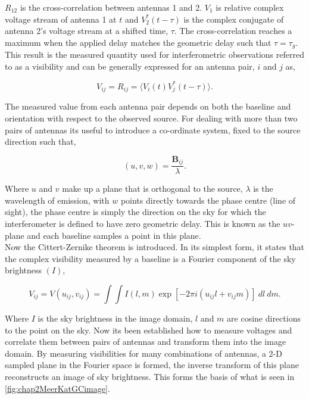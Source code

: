 $R_{12}$ is the cross-correlation between antennas 1 and 2. $V_1$ is relative complex voltage stream of antenna 1 at $t$ and $V^*_2 (t - \tau)$ is the complex conjugate of antenna 2's voltage stream at a shifted time, $\tau$. The cross-correlation reaches a maximum when the applied delay matches the geometric delay such that $\tau = \tau_g$. This result is the measured quantity used for interferometric observations referred to as a visibility and can be generally expressed for an antenna pair, $i$ and $j$ as, 

\begin{equation}
    \boxed{V_{ij} = R_{ij} = \langle  V_i (t) V^*_j (t - \tau) \rangle}.
\end{equation}

The measured value from each antenna pair depends on both the baseline and orientation with respect to the observed source. For dealing with more than two pairs of antennas its useful to introduce a co-ordinate system, fixed to the source direction such that, 

\begin{equation}
    (u, v, w) = \frac{\textbf{B}_{ij}}{\lambda}. 
\end{equation}

Where $u$ and $v$ make up a plane that is orthogonal to the source, $\lambda$ is the wavelength of emission, with $w$ points directly towards the phase centre (line of sight), the phase centre is simply the direction on the sky for which the interferometer is defined to have zero geometric delay. This is known as the $uv$-plane and each baseline samples a point in this plane. \\ 

Now the Cittert-Zernike theorem is introduced. In its simplest form, it states that the complex visibility measured by a baseline is a Fourier component of the sky brightness $(I)$, 

\begin{equation}
    V_{ij} = V (u_{ij}, v_{ij}) = \int \int I (l,m) \exp\left[ -2 \pi i (u_{ij}l + v_{ij}m) \right] ~ dl~dm.
    \label{eq:chap2CittertZernike}
\end{equation}

Where $I$ is the sky brightness in the image domain, $l$ and $m$ are cosine directions to the point on the sky. Now its been established how to measure voltages and correlate them between pairs of antennas and transform them into the image domain. By measuring visibilities for many combinations of antennas, a 2-D sampled plane in the Fourier space is formed, the inverse transform of this plane reconstructs an image of sky brightness. This forms the basis of what is seen in \cref{fig:chap2MeerKatGCimage}. 


